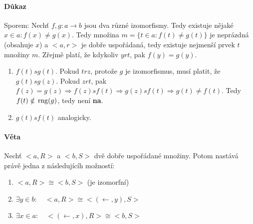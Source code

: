 \documentclass[a4paper,12pt,titlepage]{article}
\begin{document}
\paragraph{Důkaz}
Sporem: Nechť $f, g: a \to b$ jsou dva různé izomorfismy. Tedy existuje nějaké 
$x \in a: f(x) \neq g(x)$. Tedy množina $m = \{ t \in a: f(t) \neq g(t) \}$ je
neprázdná (obsahuje $x$) a $<a,r>$ je dobře uspořádaná, tedy existuje nejmenší
prvek $t$ množiny $m$. Zřejmě platí, že kdykoliv $y r t$, pak $f(y) = g(y)$.
\begin{enumerate}
	\item $f(t) s g(t)$. Pokud $t r z$, protože $g$ je izomorfismus, musí platit,
	že $g(t) s g(z)$. Pokud $z r t$, pak $f(z) = g(z) \Rightarrow f(z) s f(t)
	\Rightarrow g(z) s f(t) \Rightarrow g(t) \neq f(t)$. Tedy $f(t) \notin
	\operatorname*{\,rng}(g)$, tedy není \textbf{na}.
	\item $g(t) s f(t)$ analogicky.
\end{enumerate}
\paragraph{Věta}
Nechť $<a,R>$ a $<b,S>$ dvě dobře uspořádané množiny. Potom nastává právě jedna
z následujícíh možností:
\begin{enumerate}
	\item $<a,R> \cong <b,S>$ (je izomorfní)
	\item $\exists y \in b: \quad <a,R> \cong <(\leftarrow,y), S>$
	\item $\exists x \in a: \quad <(\leftarrow, x), R> \cong <b,S>$
\end{enumerate}
\end{document}
